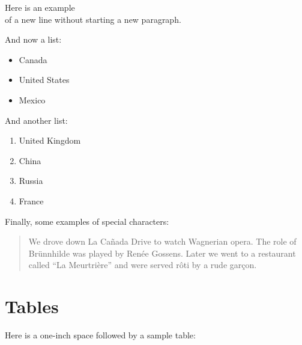 


Here is an example \\
of a new line without starting a new paragraph.



And now a list:
\begin{itemize}
	\item Canada
	\item United States
	\item Mexico
\end{itemize}

And another list:
\begin{enumerate}
	\item United Kingdom
	\item China
	\item Russia
	\item France
\end{enumerate}


Finally, some examples of special characters:
\begin{quote}
We drove down La Ca\~{n}ada Drive to watch Wagnerian opera.
The role of Br\"{u}nnhilde was played by Ren\'{e}e Gossens.
Later we went to a restaurant called ``La Meurtri\`{e}re'' and were served r\^{o}ti by a rude gar\c{c}on.
\end{quote}

\section{Tables}

Here is a one-inch space followed by a sample table:

